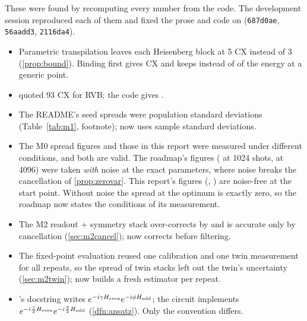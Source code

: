 These were found by recomputing every number from the code. The development session
reproduced each of them and fixed the prose and code on  (\texttt{687d0ae},
\texttt{56aadd3}, \texttt{2116da4}).
\begin{itemize}
  \item Parametric transpilation leaves each Heisenberg block at 5 CX instead of 3
    (\cref{prop:bound}). Binding first gives \VBoundCxHva{} CX and keeps \VBoundKeepHva{} instead of
    \VParamKeepHva{} of the energy at a generic point.
  \item {} quoted 93 CX for RVB; the code gives \VCxRvb.
  \item The README's seed spreads were population standard deviations (Table~\ref{tab:m1},
    footnote);  now uses sample standard deviations.
  \item The M0 spread figures and those in this report were measured under different conditions,
    and both are valid. The roadmap's figures (\VRoadmapSpreadLow{} at 1024 shots, \VRoadmapSpreadHigh{} at 4096) were taken
    \emph{with}  noise at the exact parameters, where noise breaks the
    cancellation of \cref{prop:zerovar}. This report's figures (\VSpreadLowReal, \VSpreadHighReal)
    are noise-free at the start point. Without noise the spread at the optimum is exactly zero,
    so the roadmap now states the conditions of its measurement.
  \item The M2 readout + symmetry stack over-corrects by \VMxOverPct{} and is accurate only by
    cancellation (\cref{sec:m2cancel});  now corrects before filtering.
  \item The fixed-point evaluation reused one calibration and one twin measurement for all
    repeats, so the spread of twin stacks left out the twin's uncertainty (\cref{sec:m2twin});
     now builds a fresh estimator per repeat.
  \item {}'s docstring writes $e^{-i\gamma H_{\mathrm{even}}}e^{-i\phi H_{\mathrm{odd}}}$; the circuit implements
    $e^{-i\frac\gamma2H_{\mathrm{even}}}e^{-i\frac\phi2H_{\mathrm{odd}}}$ (\cref{dfn:ansatz}). Only the convention differs.
\end{itemize}
